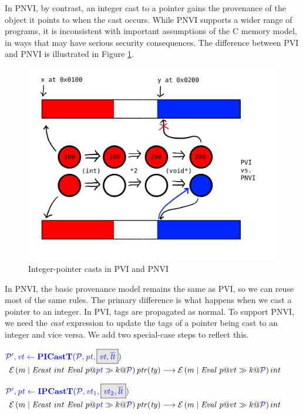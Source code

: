 \documentclass[acmsmall,review,anonymous]{acmart}\settopmatter{printfolios=true,printccs=false,printacmref=false}
\begin{document}
In PNVI, by contrast, an integer cast to a pointer gains the provenance of the object it points
to when the cast occurs. While PNVI supports a wider range of programs, it is inconsistent with important
assumptions of the C memory model, in ways that may have serious security consequences.
The difference between PVI and PNVI is illustrated in Figure \ref{fig:PVI-PNVI}.

\begin{figure}
  \includegraphics[width=.6\textwidth]{PVIvsPNVI.png}
  \caption{Integer-pointer casts in PVI and PNVI}
  \label{fig:PVI-PNVI}
\end{figure}


In PNVI, the basic provenance model remains the same as PVI, so we can reuse most of the
same rules. The primary difference is what happens when we cast a pointer to an integer.
In PVI, tags are propagated as normal.
To support PNVI, we need the {\it cast} expression to update the tags of a pointer
being cast to an integer and vice versa. We add two special-case steps to reflect this.

            {\(\trule{\picasttres}{\picastt}\)}
            {\(\mathcal{E}\left(m \mid \mathit{Ecast} ~ int ~ \mathit{Eval} ~ p@\mathit{\color{blue} pt} \gg k @ \mathcal{\color{blue} P}\right){\mathit{ptr(ty)}} \longrightarrow
              \mathcal{E}\left(m \mid \mathit{Eval} ~ p@vt \gg k @ \mathcal{\color{blue} P}\right){int}\)}

            {\(\trule{\ipcasttres}{\ipcastt}\)}
            {\(\mathcal{E}\left(m \mid \mathit{Ecast} ~ int ~ \mathit{Eval} ~ p@\mathit{\color{blue} pt} \gg k @ \mathcal{\color{blue} P}\right){\mathit{ptr(ty)}} \longrightarrow
              \mathcal{E}\left(m \mid \mathit{Eval} ~ p@vt \gg k @ \mathcal{\color{blue} P}\right){int}\)}
\end{document}
